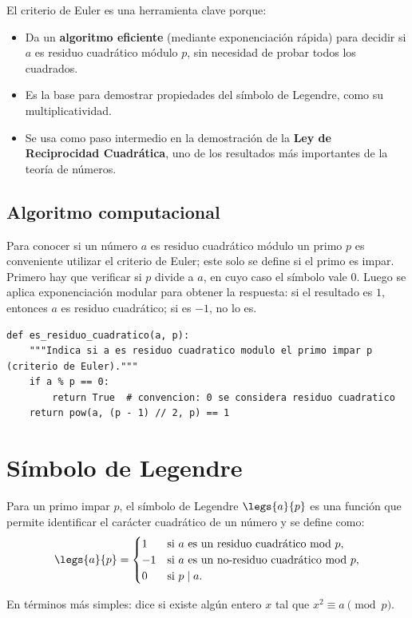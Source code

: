 El criterio de Euler es una herramienta clave porque:

\begin{itemize}
    \item Da un \textbf{algoritmo eficiente} (mediante exponenciación rápida) para decidir si $a$ es residuo cuadrático módulo $p$, sin necesidad de probar todos los cuadrados.
    \item Es la base para demostrar propiedades del símbolo de Legendre, como su multiplicatividad.
    \item Se usa como paso intermedio en la demostración de la \textbf{Ley de Reciprocidad Cuadrática}, uno de los resultados más importantes de la teoría de números.
\end{itemize}

\subsection{Algoritmo computacional}
Para conocer si un número $a$ es residuo cuadrático módulo un primo $p$ es conveniente utilizar el criterio de Euler; este solo se define si el primo es impar. Primero hay que verificar si $p$ divide a $a$, en cuyo caso el símbolo vale $0$. Luego se aplica exponenciación modular para obtener la respuesta: si el resultado es $1$, entonces $a$ es residuo cuadrático; si es $-1$, no lo es.

\begin{verbatim}
def es_residuo_cuadratico(a, p):
    """Indica si a es residuo cuadratico modulo el primo impar p (criterio de Euler)."""
    if a % p == 0:
        return True  # convencion: 0 se considera residuo cuadratico
    return pow(a, (p - 1) // 2, p) == 1
\end{verbatim}


\section{Símbolo de Legendre}

\begin{definicion}
Para un primo impar $p$, el símbolo de Legendre $\legs{a}{p}$ es una función que permite identificar el carácter cuadrático de un número y se define como:
\begin{equation}
    \legs{a}{p} =
    \begin{cases}
      1 & \text{si } a \text{ es un residuo cuadrático mod } p, \\
      -1 & \text{si } a \text{ es un no-residuo cuadrático mod } p, \\
      0 & \text{si } p \mid a.
    \end{cases}
\end{equation}
\end{definicion}
En términos más simples: dice si existe algún entero $x$ tal que $x^2 \equiv a \pmod{p}$.

